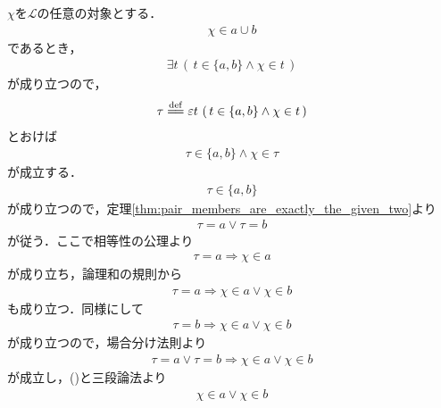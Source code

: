 	
	\begin{sketch}
		$\chi$を$\mathcal{L}$の任意の対象とする．
		\begin{align}
			\chi \in a \cup b
		\end{align}
		であるとき，
		\begin{align}
			\exists t\, \left(\, t \in \{a,b\} \wedge \chi \in t\, \right)
		\end{align}
		が成り立つので，
		\begin{align}
			\tau \defeq \varepsilon t\, \left(\, t \in \{a,b\} \wedge \chi \in t\, \right)
		\end{align}
		とおけば
		\begin{align}
			\tau \in \{a,b\} \wedge \chi \in \tau
		\end{align}
		が成立する．
		\begin{align}
			\tau \in \{a,b\}
		\end{align}
		が成り立つので，定理\ref{thm:pair_members_are_exactly_the_given_two}より
		\begin{align}
			\tau = a \vee \tau = b
			\label{fom:thm_union_of_pair_is_union_of_their_elements_1}
		\end{align}
		が従う．ここで相等性の公理より
		\begin{align}
			\tau = a \Longrightarrow \chi \in a
		\end{align}
		が成り立ち，論理和の規則から
		\begin{align}
			\tau = a \Longrightarrow \chi \in a \vee \chi \in b
		\end{align}
		も成り立つ．同様にして
		\begin{align}
			\tau = b \Longrightarrow \chi \in a \vee \chi \in b
		\end{align}
		が成り立つので，場合分け法則より
		\begin{align}
			\tau = a \vee \tau = b \Longrightarrow \chi \in a \vee \chi \in b
		\end{align}
		が成立し，()と三段論法より
		\begin{align}
			\chi \in a \vee \chi \in b

\end{align}
\end{sketch}
